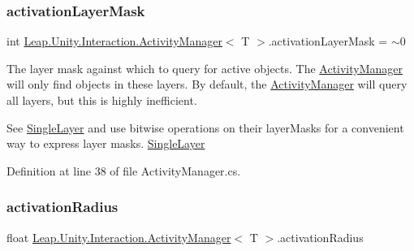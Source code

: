 \mbox{\label{class_leap_1_1_unity_1_1_interaction_1_1_activity_manager_a9309b4766f479c3fa53aedae93ccb060}} 
\subsubsection{\texorpdfstring{activationLayerMask}{activationLayerMask}}
{\footnotesize\ttfamily int \mbox{\hyperlink{class_leap_1_1_unity_1_1_interaction_1_1_activity_manager}{Leap.\+Unity.\+Interaction.\+Activity\+Manager}}$<$ T $>$.activation\+Layer\+Mask = $\sim$0}



The layer mask against which to query for active objects. The \mbox{\hyperlink{class_leap_1_1_unity_1_1_interaction_1_1_activity_manager}{Activity\+Manager}} will only find objects in these layers. By default, the \mbox{\hyperlink{class_leap_1_1_unity_1_1_interaction_1_1_activity_manager}{Activity\+Manager}} will query all layers, but this is highly inefficient. 

See \mbox{\hyperlink{struct_leap_1_1_unity_1_1_single_layer}{Single\+Layer}} and use bitwise operations on their layer\+Masks for a convenient way to express layer masks. \mbox{\hyperlink{struct_leap_1_1_unity_1_1_single_layer}{Single\+Layer}} 

Definition at line 38 of file Activity\+Manager.\+cs.

\mbox{\label{class_leap_1_1_unity_1_1_interaction_1_1_activity_manager_ae47334dd4fde13e8908798fe74cb4e52}} 
\subsubsection{\texorpdfstring{activationRadius}{activationRadius}}
{\footnotesize\ttfamily float \mbox{\hyperlink{class_leap_1_1_unity_1_1_interaction_1_1_activity_manager}{Leap.\+Unity.\+Interaction.\+Activity\+Manager}}$<$ T $>$.activation\+Radius}



